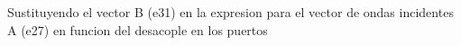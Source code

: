 \documentclass{article}
\begin{document}
\begin{Maple Normal}{
\begin{Maple Normal}{
}\end{Maple Normal}
}\end{Maple Normal}
\begin{maplegroup}
\mapleresult
{}
\end{maplegroup}
\begin{Maple Normal}{
\begin{Maple Normal}{
Sustituyendo el vector B (e31) en la expresion para el vector de ondas incidentes A (e27) en funcion del desacople en los puertos}\end{Maple Normal}

}\end{Maple Normal}
\end{document}
